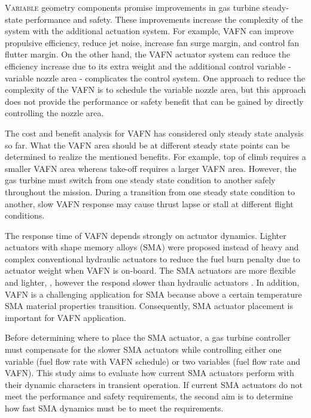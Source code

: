 
\lettrine[nindent=0pt]{V}{ariable} geometry components promise improvements
in gas turbine steady-state performance and safety. These improvements 
increase the complexity of the system with the additional actuation system. For
example, VAFN can improve propulsive efficiency, reduce jet noise, increase fan 
surge margin, and control fan flutter margin. On the other hand, the VAFN 
actuator system can reduce the efficiency increase due to its extra weight and 
the additional control variable - variable nozzle area - complicates the control 
system. One approach to reduce the complexity of the VAFN is to schedule the 
variable nozzle area, but this approach does not provide the performance or 
safety benefit that can be gained by directly controlling the nozzle area.

The cost and benefit analysis for VAFN has considered only steady state analysis
so far. What the VAFN area should be at different steady state points can be 
determined to realize the mentioned benefits. For example, top of climb requires 
a smaller VAFN area whereas take-off requires a larger VAFN area. However, the
gas turbine must switch from one steady state condition to another safely 
throughout the mission. During a transition from one steady state condition to 
another, slow VAFN response may cause thrust lapse or stall at different flight 
conditions.

The response time of VAFN depends strongly on actuator dynamics. Lighter 
actuators with shape memory alloys (SMA) \cite{Mabe:2008,Mabe:2008:Paris} 
were proposed instead of heavy and complex conventional hydraulic actuators to
reduce the fuel burn penalty due to actuator weight when VAFN is on-board. 
The SMA actuators are more flexible and lighter, , however the respond slower 
than hydraulic actuators \cite{Rey:2001,Barooah:2002,Song:2007}. In addition, 
VAFN is a challenging application for SMA because above a certain temperature 
SMA material properties transition. Consequently, SMA actuator placement is 
important for VAFN application.

Before determining where to place the SMA actuator, a gas turbine controller 
must compensate for the slower SMA actuators while controlling either one 
variable (fuel flow rate with VAFN schedule) or two variables (fuel flow rate and 
VAFN). This study aims to evaluate how current SMA actuators perform with 
their dynamic characters in transient operation. If current SMA actuators do not 
meet the performance and safety requirements, the second aim is to determine 
how fast SMA dynamics must be to meet the requirements.


